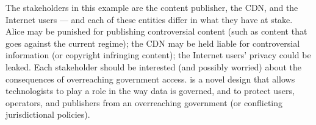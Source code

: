 The stakeholders in this example are the content publisher, the CDN, and the
Internet users --- and each of these entities differ in what  they have at
stake.  Alice may be punished for publishing controversial content (such as
content that  goes against the current regime); the CDN  may be held liable
for controversial information (or copyright infringing content); the Internet
users'  privacy could be leaked.  Each stakeholder should be interested (and
possibly worried) about the  consequences of overreaching government access.
\system{} is a novel design that allows technologists to play  a role in the
way data is governed, and to protect users, operators, and publishers from an
overreaching government (or  conflicting jurisdictional policies).
\fi 
